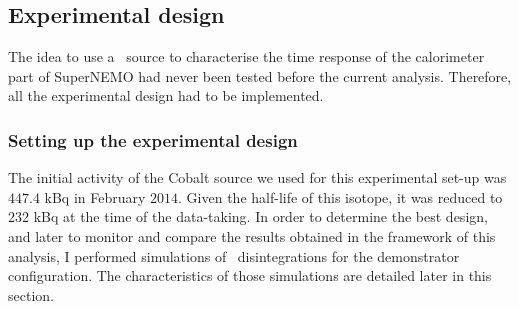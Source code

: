 \subsection{Experimental design}
\label{subsec:Co_setup}


The idea to use a \Co\ source to characterise the time response of the calorimeter part of SuperNEMO had never been tested before the current analysis.
Therefore, all the experimental design had to be implemented.


\subsubsection*{Setting up the experimental design}


The initial activity of the Cobalt source we used for this experimental set-up was $447.4$ kBq in February $2014$.
Given the half-life of this isotope, it was reduced to $232$ kBq at the time of the data-taking.
In order to determine the best design, and later to monitor and compare the results obtained in the framework of this analysis, I performed simulations of \Co\ disintegrations for the demonstrator configuration.
The characteristics of those simulations are detailed later in this section.

